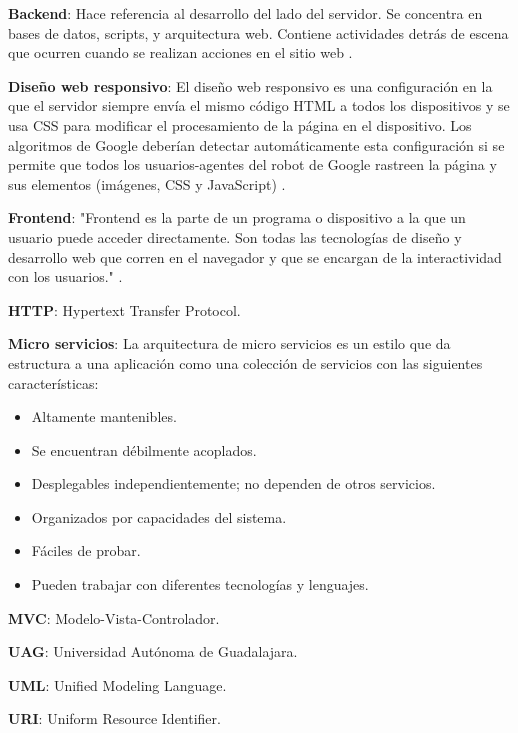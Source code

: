     \textbf{Backend}: Hace referencia al desarrollo del lado del servidor. Se concentra en bases de datos, scripts, y arquitectura web. Contiene actividades detrás de escena que ocurren cuando se realizan acciones en el sitio web \cite{Backend}.

    \textbf{Diseño web responsivo}: El diseño web responsivo es una configuración en la que el servidor siempre envía el mismo código HTML a todos los dispositivos y se usa CSS para modificar el procesamiento de la página en el dispositivo. Los algoritmos de Google deberían detectar automáticamente esta configuración si se permite que todos los usuarios-agentes del robot de Google rastreen la página y sus elementos (imágenes, CSS y JavaScript) \cite{GoogleResponsivo}.
    
    \textbf{Frontend}: "Frontend es la parte de un programa o dispositivo a la que un usuario puede acceder directamente. Son todas las tecnologías de diseño y desarrollo web que corren en el navegador y que se encargan de la interactividad con los usuarios." \cite{Frontend}.
    
    \textbf{HTTP}: Hypertext Transfer Protocol.
    
    \textbf{Micro servicios}: La arquitectura de micro servicios es un estilo que da estructura a una aplicación como una colección de servicios con las siguientes características\cite{richards2020fundamentals}:
    
    \begin{itemize}
        \item Altamente mantenibles.
        \item Se encuentran débilmente acoplados.
        \item Desplegables independientemente; no dependen de otros servicios.
        \item Organizados por capacidades del sistema.
        \item Fáciles de probar.
        \item Pueden trabajar con diferentes tecnologías y lenguajes.
    \end{itemize}
    
    \textbf{MVC}: Modelo-Vista-Controlador.
    
    \textbf{UAG}: Universidad Autónoma de Guadalajara.
    
    \textbf{UML}: Unified Modeling Language.
    
    \textbf{URI}: Uniform Resource Identifier.